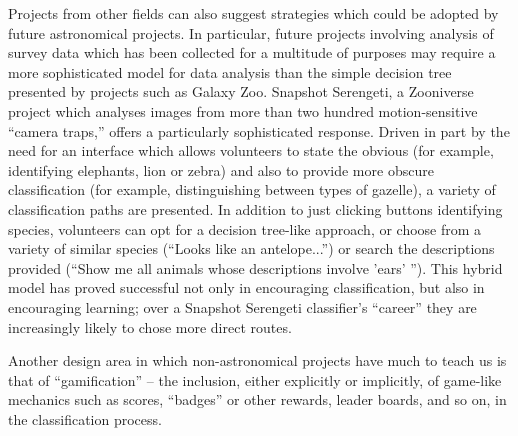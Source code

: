 \documentclass{ar2e}
\begin{document}
Projects from other fields can also suggest strategies which could be adopted
by future astronomical projects. In particular, future projects involving
analysis of survey data which has been collected for a multitude of purposes
may require a more sophisticated model for data analysis than the simple
decision tree presented by projects such as Galaxy Zoo. Snapshot Serengeti, a
Zooniverse project which analyses images from more than two hundred
motion-sensitive ``camera traps,'' offers a particularly sophisticated response.
Driven in part by the need for an interface which allows volunteers to state
the obvious (for example, identifying elephants, lion or zebra) and also to
provide more obscure classification (for example, distinguishing between types
of gazelle), a variety of classification paths are presented. In addition to
just clicking buttons identifying species, volunteers can opt for a decision
tree-like approach, or choose from a variety of similar species (``Looks like
an antelope...'') or search the descriptions provided (``Show me all animals
whose descriptions involve 'ears' ''). This hybrid model has proved successful
not only in encouraging classification, but also in encouraging learning; over
a Snapshot Serengeti classifier's ``career'' they are increasingly likely to
chose more direct routes.



Another design area in which non-astronomical projects have much to teach us
is that of ``gamification'' -- the inclusion, either
explicitly or implicitly, of game-like mechanics such as scores, ``badges'' or
other rewards, leader boards, and so on, in the classification process.

\end{document}
